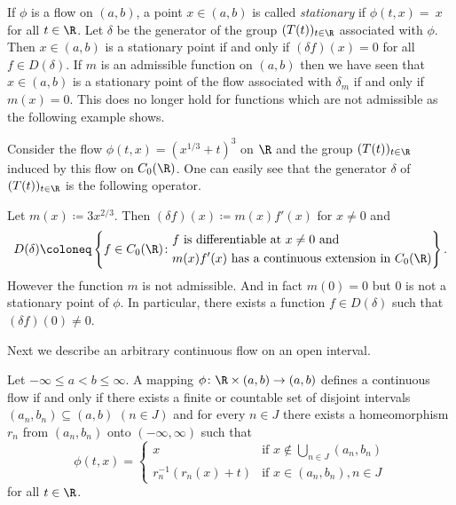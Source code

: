 \begin{remark}\label{rem:b2-3.19}
%
If\/ $\phi$ is a flow on $(a,b)$, a point $x \in (a,b)$ is called \emph{stationary} if\/ $\phi(t,x) =~x$ for all $t \in \R$.
Let $\delta$ be the generator of the group $(T(t))_{t \in \R}$ associated with $\phi$.
Then $x \in (a,b)$ is a stationary point if and only if\/ $(\delta f)(x) = 0$ for all $f \in D(\delta)$.
If\/ $m$ is an admissible function on $(a,b)$ then we have seen that $x \in (a,b)$ is a stationary point of the flow associated with $\delta_{m}$ if and only if\/ $m(x) = 0$.
This does no longer hold for functions which are not admissible as the following example shows.
\end{remark}
\begin{example}\label{ex:b2-3.20}
%
Consider the flow $\phi(t,x) = (x^{1/3} + t)^{3}$ on $\R$ and the group $(T(t))_{t \in \R}$ induced by this flow on $C_{0}(\R)$.
One can easily see that the generator $\delta$ of\/ $(T(t))_{t \in \R}$ is the following operator.

Let $m(x) \coloneq 3x^{2/3}$.
Then $(\delta f)(x) \coloneq m(x)f'(x)$ for $x \neq 0$ and 
\begin{equation*}
D(\delta) \coloneq 
\left\{ f \in C_{0}(\R) \colon 
\begin{aligned}
	&f \text{ is differentiable at } x \neq 0 \text{ and } \\
	&m(x)f'(x) \text{ has a continuous extension in } C_{0}(\R)
\end{aligned}
\right\}.
\end{equation*}
However the function $m$ is not admissible.
And in fact $m(0) = 0$ but $0$ is not a stationary point of\/ $\phi$.
In particular, there exists a function $f \in D(\delta)$ such that $(\delta f)(0) \neq 0$.
\end{example}
Next we describe an arbitrary continuous flow on an open interval.
\begin{proposition}\label{prop:b2-3.21}
%
Let $-\infty \leq a < b \leq \infty$.
A mapping $\phi \colon \R \times (a,b) \to (a,b)$ defines a continuous flow if and only if there exists a finite or countable set of disjoint intervals $(a_{n},b_{n}) \subseteq (a,b)$ $(n \in J)$ and for every $n \in J$ there exists a homeomorphism $r_{n}$ from $(a_{n},b_{n})$ onto $(-\infty,\infty)$ such that
\begin{equation*}\label{eq:b2-flow}
\phi(t,x) = \begin{cases}
    x & \text{if } x \notin \bigcup_{n \in J} (a_{n},b_{n}) \\
    r_{n}^{-1}(r_{n}(x) + t) & \text{if } x \in (a_{n},b_{n}), n \in J
\end{cases}
\end{equation*}
for all $t \in \R$.
\end{proposition}
